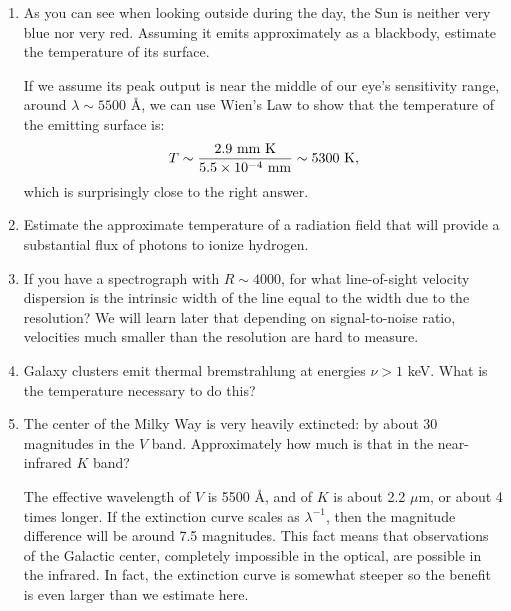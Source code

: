 \begin{enumerate} 
\item As you can see when looking outside during the day, the Sun is
    neither very blue nor very red. Assuming it emits approximately as
    a blackbody, estimate the temperature of its surface.

\begin{answer}
If we assume its peak output is near the middle of our eye's
sensitivity range, around $\lambda \sim 5500$ \AA, we can use Wien's
Law to show that the temperature of the emitting surface is:
\begin{equation}
T \sim \frac{2.9 {\rm ~mm~K}}{5.5 \times 10^{-4} {\rm ~mm}} \sim 5300
{\rm ~K},
\end{equation}
which is surprisingly close to the right answer.
\end{answer}

\item Estimate the approximate temperature of a radiation field that
    will provide a substantial flux of photons to ionize hydrogen.

\item If you have a spectrograph with $R\sim 4000$, for what
line-of-sight velocity dispersion is the intrinsic width of the line
equal to the width due to the resolution?  We will learn later that
depending on signal-to-noise ratio, velocities much smaller than the
resolution are hard to measure.

\item Galaxy clusters emit thermal bremstrahlung at energies $\nu > 1$
keV. What is the temperature necessary to do this? 

\item The center of the Milky Way is very heavily extincted: by about
    30 magnitudes in the $V$ band. Approximately how much is that in
    the near-infrared $K$ band?

\begin{answer}
The effective wavelength of $V$ is 5500 {\AA}, and of $K$ is about 2.2
  $\mu$m, or about 4 times longer. If the extinction curve scales as
  $\lambda^{-1}$, then the magnitude difference will be around 7.5
  magnitudes. This fact means that observations of the Galactic
  center, completely impossible in the optical, are possible in the
  infrared.  In fact, the extinction curve is somewhat steeper so the
  benefit is even larger than we estimate here.
\end{answer}

\end{enumerate}   

